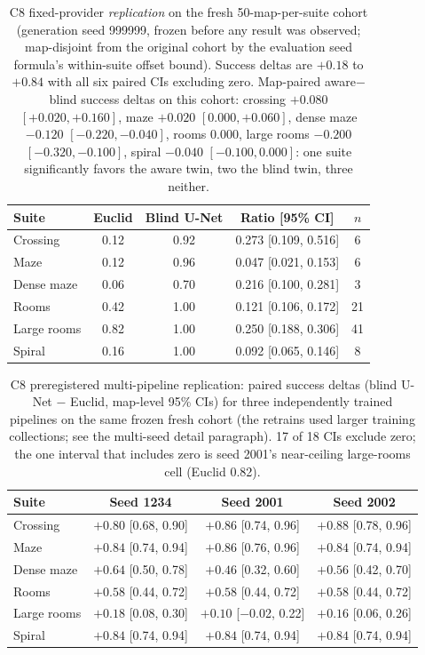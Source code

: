 \documentclass[letterpaper]{article} %
\newcommand{\stage}[1]{\textsc{#1}}
\begin{document}
\begin{table}[t]
\centering
\small
\setlength{\tabcolsep}{3pt}
\begin{tabular}{@{}lcccc@{}}
\toprule
Suite & Euclid & Blind U-Net & Ratio [95\% CI] & $n$ \\
\midrule
Crossing & 0.12 & 0.92 & 0.273 [0.109, 0.516] & 6 \\
Maze & 0.12 & 0.96 & 0.047 [0.021, 0.153] & 6 \\
Dense maze & 0.06 & 0.70 & 0.216 [0.100, 0.281] & 3 \\
Rooms & 0.42 & 1.00 & 0.121 [0.106, 0.172] & 21 \\
Large rooms & 0.82 & 1.00 & 0.250 [0.188, 0.306] & 41 \\
Spiral & 0.16 & 1.00 & 0.092 [0.065, 0.146] & 8 \\
\bottomrule
\end{tabular}
\caption{\stage{C8} fixed-provider \emph{replication} on the fresh 50-map-per-suite cohort (generation seed 999999, frozen before any result was observed; map-disjoint from the original cohort by the evaluation seed formula's within-suite offset bound). Success deltas are $+0.18$ to $+0.84$ with all six paired CIs excluding zero. Map-paired aware$-$blind success deltas on this cohort: crossing $+0.080$ $[+0.020,+0.160]$, maze $+0.020$ $[0.000,+0.060]$, dense maze $-0.120$ $[-0.220,-0.040]$, rooms $0.000$, large rooms $-0.200$ $[-0.320,-0.100]$, spiral $-0.040$ $[-0.100,0.000]$: one suite significantly favors the aware twin, two the blind twin, three neither.}
\label{tab:c8fresh}
\end{table}

\begin{table}[t]
\centering
\small
\setlength{\tabcolsep}{2.6pt}
\begin{tabular}{@{}lccc@{}}
\toprule
Suite & Seed 1234 & Seed 2001 & Seed 2002 \\
\midrule
Crossing & $+0.80$ [0.68, 0.90] & $+0.86$ [0.74, 0.96] & $+0.88$ [0.78, 0.96] \\
Maze & $+0.84$ [0.74, 0.94] & $+0.86$ [0.76, 0.96] & $+0.84$ [0.74, 0.94] \\
Dense maze & $+0.64$ [0.50, 0.78] & $+0.46$ [0.32, 0.60] & $+0.56$ [0.42, 0.70] \\
Rooms & $+0.58$ [0.44, 0.72] & $+0.58$ [0.44, 0.72] & $+0.58$ [0.44, 0.72] \\
Large rooms & $+0.18$ [0.08, 0.30] & $+0.10$ [$-$0.02, 0.22] & $+0.16$ [0.06, 0.26] \\
Spiral & $+0.84$ [0.74, 0.94] & $+0.84$ [0.74, 0.94] & $+0.84$ [0.74, 0.94] \\
\bottomrule
\end{tabular}
\caption{\stage{C8} preregistered multi-pipeline replication: paired success deltas (blind U-Net $-$ Euclid, map-level 95\% CIs) for three independently trained pipelines on the same frozen fresh cohort (the retrains used larger training collections; see the multi-seed detail paragraph). 17 of 18 CIs exclude zero; the one interval that includes zero is seed 2001's near-ceiling large-rooms cell (Euclid 0.82).}
\label{tab:c8seeds}
\end{table}
\end{document}
